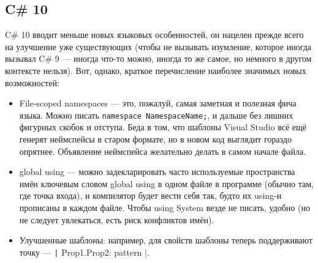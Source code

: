 \documentclass[a5paper]{article}
\begin{document}
\subsection{C\# 10}

C\# 10 вводит меньше новых языковых особенностей, он нацелен прежде всего на улучшение уже существующих (чтобы не вызывать изумление, которое иногда вызывал C\# 9 --- иногда что-то можно, иногда то же самое, но немного в другом контексте нельзя). Вот, однако, краткое перечисление наиболее значимых новых возможностей:

\begin{itemize}
    \item File-scoped namespaces --- это, пожалуй, самая заметная и полезная фича языка. Можно писать \texttt{namespace NamespaceName;}, и дальше без лишних фигурных скобок и отступа. Беда в том, что шаблоны Visual Studio всё ещё генерят неймспейсы в старом формате, но в новом код выглядит гораздо опрятнее. Объявление неймспейса желательно делать в самом начале файла.
    \item global using --- можно задекларировать часто используемые пространства имён ключевым словом global using в одном файле в программе (обычно там, где точка входа), и компилятор будет вести себя так, будто их using-и прописаны в каждом файле. Чтобы using System везде не писать, удобно (но не следует увлекаться, есть риск конфликтов имён).
    \item Улучшенные шаблоны: например, для свойств шаблоны теперь поддерживают точку --- \texttt|{ Prop1.Prop2: pattern }|.
\end{itemize}
\end{document}
